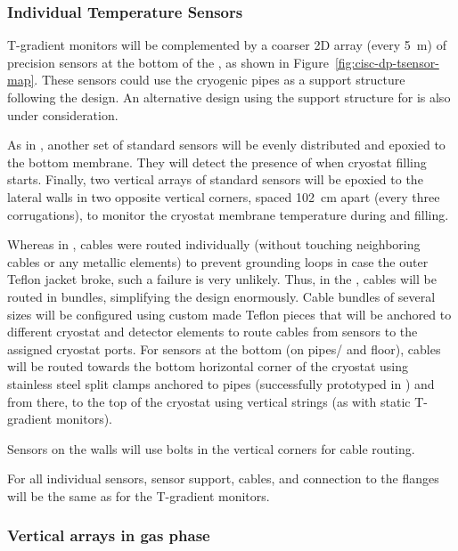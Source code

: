 \subsubsection{Individual Temperature Sensors}
\label{sec:fdgen-slow-cryo-individual-therm}

T-gradient monitors will be complemented by a coarser 2D array (every \SI{5}{m}) of precision sensors at the bottom of the , as shown in Figure~\ref{fig:cisc-dp-tsensor-map}. These sensors could  use the cryogenic pipes as a support structure following the  design. An alternative design using the support structure for  is also under consideration.  

As in , another set of standard sensors will be evenly distributed and epoxied to the bottom membrane. They will detect the presence of \lar when cryostat filling starts. Finally, two vertical arrays of standard sensors will be epoxied to the lateral walls in two opposite vertical corners, spaced \SI{102}{cm} apart (every three corrugations), to monitor the cryostat membrane temperature during \cooldown and filling. 

 
Whereas in , cables were routed individually (without touching neighboring cables or any metallic elements) to prevent grounding loops in case the outer Teflon jacket broke, such a failure is very unlikely. Thus, in the , cables will be routed in bundles, simplifying the design enormously. 
Cable bundles of several sizes will be configured using custom made Teflon 
pieces  
that will be anchored to different cryostat and detector elements to route cables from sensors to the assigned cryostat ports. For sensors at the bottom (on pipes/ and floor), cables will be routed towards the bottom horizontal corner of the cryostat using stainless steel split clamps anchored to pipes (successfully prototyped in ) and from there, to the top of the cryostat using vertical strings (as with static T-gradient monitors). 

Sensors on the walls will use bolts in the vertical corners for cable routing. 

For all individual sensors,  sensor support, cables, and connection to the flanges will be the same as for the T-gradient monitors. 
  



\subsubsection{Vertical arrays in gas phase}
\label{sec:fdgen-slow-cryo-static-therm-gass}

